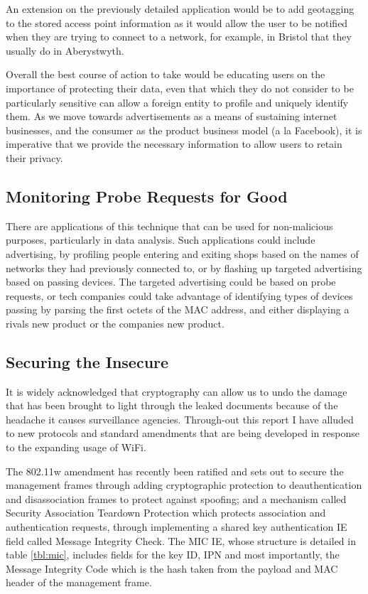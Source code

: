An extension on the previously detailed application would be to add geotagging to the stored access point information as it would allow the user to be notified when they are trying to connect to a network, for example, in Bristol that they usually do in Aberystwyth.

Overall the best course of action to take would be educating users on the importance of protecting their data, even that which they do not consider to be particularly sensitive can allow a foreign entity to profile and uniquely identify them. As we move towards advertisements as a means of sustaining internet businesses, and the consumer as the product business model (a la Facebook), it is imperative that we provide the necessary information to allow users to retain their privacy. 
\newpage
\subsection{Monitoring Probe Requests for Good}
\label{conclusion:for-good}
There are applications of this technique that can be used for non-malicious purposes, particularly in data analysis. Such applications could include advertising, by profiling people entering and exiting shops based on the names of networks they had previously connected to, or by flashing up targeted advertising based on passing devices. The targeted advertising could be based on probe requests, or tech companies could take advantage of identifying types of devices passing by parsing the first octets of the MAC address, and either displaying a rivals new product or the companies new product.

\subsection{Securing the Insecure}
\label{80211w}
It is widely acknowledged that cryptography can allow us to undo the damage that has been brought to light through the leaked documents because of the headache it causes surveillance agencies. Through-out this report I have alluded to new protocols and standard amendments that are being developed in response to the expanding usage of WiFi. 

The 802.11w amendment has recently been ratified and sets out to secure the management frames through adding cryptographic protection to deauthentication and disassociation frames to protect against spoofing; and a mechanism called Security Association Teardown Protection which protects association and authentication requests, through implementing a shared key authentication IE field called  Message Integrity Check. The MIC IE, whose structure is detailed in table \ref{tbl:mic}, includes fields for the key ID, IPN and most importantly, the Message Integrity Code which is the hash taken from the payload and MAC header of the management frame. 

